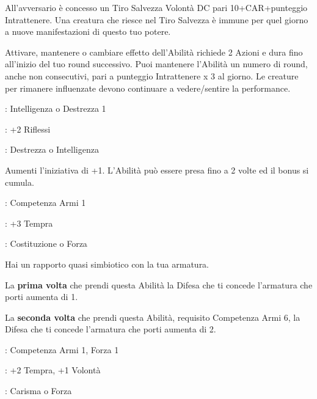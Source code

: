 \begin{multicols}{2}
All'avversario è concesso un Tiro Salvezza Volontà DC pari 10+CAR+punteggio Intrattenere. Una creatura che riesce nel Tiro Salvezza è immune per quel giorno a nuove manifestazioni di questo tuo potere.

Attivare, mantenere o cambiare effetto dell'Abilità richiede 2 Azioni e dura fino all'inizio del tuo round successivo. Puoi mantenere l'Abilità un numero di round, anche non consecutivi, pari a punteggio Intrattenere x 3 al giorno. Le creature per rimanere influenzate devono continuare a vedere/sentire la performance.

\begin{description}[noitemsep, topsep=0pt, parsep=0pt, partopsep=0pt, leftmargin=0cm, labelwidth=2.5cm]
    \item[\textbf{Requisito}]: Intelligenza o Destrezza 1
    \item[\textbf{Tiri Salvezza}]: +2 Riflessi
    \item[\textbf{Caratteristica}]: Destrezza o Intelligenza
\end{description}

Aumenti l'iniziativa di +1. L'Abilità può essere presa fino a 2 volte ed il bonus si cumula.

\begin{description}[noitemsep, topsep=0pt, parsep=0pt, partopsep=0pt, leftmargin=0cm, labelwidth=2.5cm]
    \item[\textbf{Requisito}]: Competenza Armi 1
    \item[\textbf{Tiri Salvezza}]: +3 Tempra
    \item[\textbf{Caratteristica}]: Costituzione o Forza
\end{description}

Hai un rapporto quasi simbiotico con la tua armatura.

La \textbf{prima volta} che prendi questa Abilità la Difesa che ti concede l'armatura che porti aumenta di 1.

La \textbf{seconda volta} che prendi questa Abilità, requisito Competenza Armi 6, la Difesa che ti concede l'armatura che porti aumenta di 2.

\begin{description}[noitemsep, topsep=0pt, parsep=0pt, partopsep=0pt, leftmargin=0cm, labelwidth=2.5cm]
    \item[\textbf{Requisito}]: Competenza Armi 1, Forza 1

    \item[\textbf{Tiri Salvezza}]: +2 Tempra, +1 Volontà
    \item[\textbf{Caratteristica}]: Carisma o Forza
\end{description}


\end{multicols}
